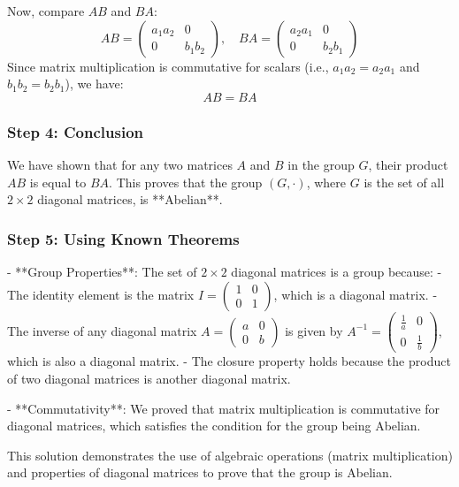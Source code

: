 \documentclass{article}
\begin{document}
Now, compare \( AB \) and \( BA \):
\[
AB = \begin{pmatrix} a_1 a_2 & 0 \\ 0 & b_1 b_2 \end{pmatrix}, \quad BA = \begin{pmatrix} a_2 a_1 & 0 \\ 0 & b_2 b_1 \end{pmatrix}
\]
Since matrix multiplication is commutative for scalars (i.e., \( a_1 a_2 = a_2 a_1 \) and \( b_1 b_2 = b_2 b_1 \)), we have:
\[
AB = BA
\]

\subsubsection*{Step 4: Conclusion}

We have shown that for any two matrices \( A \) and \( B \) in the group \( G \), their product \( AB \) is equal to \( BA \). This proves that the group \( (G, \cdot) \), where \( G \) is the set of all \( 2 \times 2 \) diagonal matrices, is **Abelian**.

\subsubsection*{Step 5: Using Known Theorems}

- **Group Properties**: The set of \( 2 \times 2 \) diagonal matrices is a group because:
  - The identity element is the matrix \( I = \begin{pmatrix} 1 & 0 \\ 0 & 1 \end{pmatrix} \), which is a diagonal matrix.
  - The inverse of any diagonal matrix \( A = \begin{pmatrix} a & 0 \\ 0 & b \end{pmatrix} \) is given by \( A^{-1} = \begin{pmatrix} \frac{1}{a} & 0 \\ 0 & \frac{1}{b} \end{pmatrix} \), which is also a diagonal matrix.
  - The closure property holds because the product of two diagonal matrices is another diagonal matrix.

- **Commutativity**: We proved that matrix multiplication is commutative for diagonal matrices, which satisfies the condition for the group being Abelian.

This solution demonstrates the use of algebraic operations (matrix multiplication) and properties of diagonal matrices to prove that the group is Abelian. 
\end{document}
